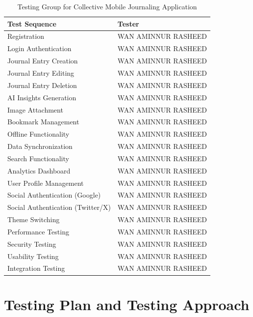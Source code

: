 \begin{table}[H]
\centering
\caption{Testing Group for Collective Mobile Journaling Application}
\label{tab:testing-group}
\begin{tabular}{|p{6cm}|p{8cm}|}
\hline
\textbf{Test Sequence} & \textbf{Tester} \\
\hline
Registration & WAN AMINNUR RASHEED \\
\hline
Login Authentication & WAN AMINNUR RASHEED \\
\hline
Journal Entry Creation & WAN AMINNUR RASHEED \\
\hline
Journal Entry Editing & WAN AMINNUR RASHEED \\
\hline
Journal Entry Deletion & WAN AMINNUR RASHEED \\
\hline
AI Insights Generation & WAN AMINNUR RASHEED \\
\hline
Image Attachment & WAN AMINNUR RASHEED \\
\hline
Bookmark Management & WAN AMINNUR RASHEED \\
\hline
Offline Functionality & WAN AMINNUR RASHEED \\
\hline
Data Synchronization & WAN AMINNUR RASHEED \\
\hline
Search Functionality & WAN AMINNUR RASHEED \\
\hline
Analytics Dashboard & WAN AMINNUR RASHEED \\
\hline
User Profile Management & WAN AMINNUR RASHEED \\
\hline
Social Authentication (Google) & WAN AMINNUR RASHEED \\
\hline
Social Authentication (Twitter/X) & WAN AMINNUR RASHEED \\
\hline
Theme Switching & WAN AMINNUR RASHEED \\
\hline
Performance Testing & WAN AMINNUR RASHEED \\
\hline
Security Testing & WAN AMINNUR RASHEED \\
\hline
Usability Testing & WAN AMINNUR RASHEED \\
\hline
Integration Testing & WAN AMINNUR RASHEED \\
\hline
\end{tabular}
\end{table}

\section{Testing Plan and Testing Approach}\label{sec:testingPlan}

